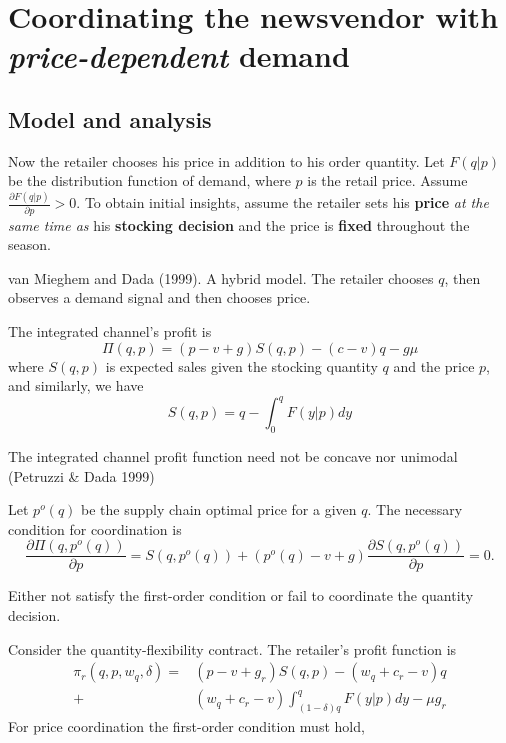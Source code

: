 \newcommand{\spq}{S(q,p^o(q))}
\newcommand{\pq}{p^o(q)}
\thispagestyle{empty}
\section{Coordinating the newsvendor with \textit{price-dependent} demand}


\subsection{Model and analysis}
Now the retailer chooses his price in addition to his order quantity. Let $F(q|p)$ be the distribution function of demand, where $p$ is the retail price. Assume $\frac{\partial F(q|p)}{\partial p}>0$. To obtain initial insights, assume the retailer sets his \textbf{price} \textit{at the same time as} his \textbf{stocking decision} and the price is \textbf{fixed} throughout the season.
\begin{note}
    van Mieghem and Dada (1999). A hybrid model. The retailer chooses $q$, then observes a demand signal and then chooses price.
\end{note}

The integrated channel's profit is 
\begin{equation*}
    \Pi(q,p)=(p-v+g)S(q,p)-(c-v)q-g\mu
\end{equation*}
where $S(q,p)$ is expected sales given the stocking quantity $q$ and the price $p$, and similarly, we have
\begin{equation*}
    S(q,p)=q-\int_0^q F(y|p)dy
\end{equation*}
\begin{note}
    The integrated channel profit function need not be concave nor unimodal (Petruzzi \& Dada 1999)
\end{note}
Let $\pq$ be the supply chain optimal price for a given $q$. The necessary condition for coordination is
\begin{equation}\label{eq:3.1}
    \frac{\partial\Pi(q,p^o(q))}{\partial p}=S(q,p^o(q))+(p^o(q)-v+g)\frac{\partial S(q,p^o(q))}{\partial p}=0.
\end{equation}
\begin{note}
    Either not satisfy the first-order condition or fail to coordinate the quantity decision.
\end{note}

Consider the quantity-flexibility contract. The retailer's profit function is 
\begin{align*}
    \pi_r(q,p,w_q,\delta)=&(p-v+g_r)S(q,p)-(w_q+c_r-v)q\\
    +&(w_q+c_r-v)\int_{(1-\delta)q}^q F(y|p)dy-\mu g_r
\end{align*}
For price coordination the first-order condition must hold,

